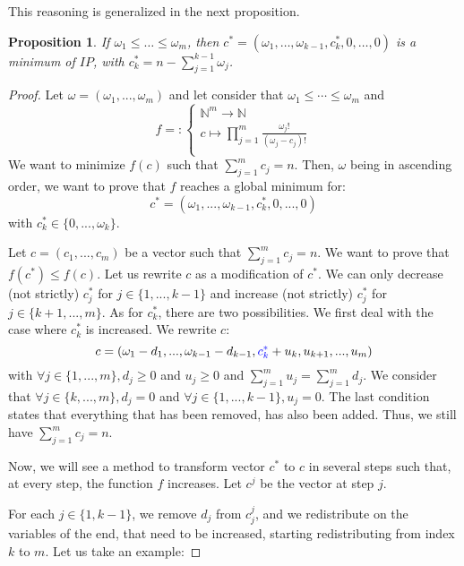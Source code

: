 \documentclass[jair,twoside,11pt,theapa]{article}
\newtheorem{proposition}[theorem]{Proposition}
\newcommand{\minor}[1]{\textcolor{blue}{#1}}
\newcommand{\N}{\mathbb{N}}
\begin{document}
This reasoning is generalized in the next proposition.
\begin{proposition}
If $\omega_1 \leq \ldots \leq \omega_m$, then $c^*=(\omega_1, \ldots, \omega_{k-1}, c^*_k, 0, \ldots, 0)$ is a minimum of $IP$, with $c^*_k = n-\sum_{j=1}^{k-1} \omega_j$.
\end{proposition}
\begin{proof}
Let $\omega = (\omega_1,...,\omega_m)$ and let consider that $\omega_1 \leq \cdots \leq \omega_m$ and 
\begin{equation}
f = \colon\begin{cases}
\N^m \rightarrow \N \\
c \mapsto \prod_{j=1}^m \frac{\omega_j !}{(\omega_j - c_j) !}\\
\end{cases}
\end{equation}
We want to minimize $f(c)$ such that $\sum_{j=1}^m c_j = n$. Then, $\omega$ being in ascending order, we want to prove that $f$ reaches a global minimum for:
\begin{equation}
 c^*=(\omega_1,...,\omega_{k-1}, c^*_k, 0,...,0) 
\end{equation}
with $c^*_k \in \lbrace 0,...,\omega_k \rbrace$.

Let $c=(c_1,...,c_m)$ be a vector such that $\sum_{j=1}^m c_j = n$. We want to prove that $f(c^*) \leq f(c)$. Let us rewrite $c$ as a modification of $c^*$. We can only decrease (not strictly) $c^*_j$ for $j \in \lbrace 1,..., k-1\rbrace$ and increase (not strictly) $c^*_j$ for $j \in \lbrace k+1,..., m\rbrace$. As for $c^*_k$, there are two possibilities. We first deal with the case where $c^*_k$ is increased. We rewrite $c$:
\begin{equation}
	c=(\omega_1-d_1, ..., \omega_{k-1}-d_{k-1}, \minor{c^*_k} +u_k, u_{k+1},...,u_m)
\end{equation}
with $\forall j \in \lbrace 1,...,m \rbrace, d_j \geq 0$ and $u_j \geq 0$ and $\sum_{j=1}^m u_j = \sum_{j=1}^m d_j$. We consider that $\forall j \in \lbrace k,...,m\rbrace , d_j=0$ and $\forall j \in \lbrace1,...,k-1 \rbrace, u_j=0$. The last condition states that everything that has been removed, has also been added. Thus, we still have $\sum_{j=1}^m c_j = n$.

Now, we will see a method to transform vector $c^*$ to $c$ in several steps such that, at every step, the function $f$ increases. Let $c^j$ be the vector at step $j$.

For each $j \in \lbrace 1, k-1\rbrace$, we remove $d_j$ from $c^j_j$, and we redistribute on the variables of the end, that need to be increased, starting redistributing from index $k$ to $m$. Let us take an example:


\end{proof}
\end{document}
